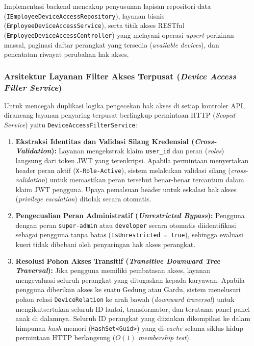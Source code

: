 Implementasi backend mencakup penyusunan lapisan repositori data (\texttt{IEmployeeDeviceAccessRepository}), layanan bisnis (\texttt{EmployeeDeviceAccessService}), serta titik akses RESTful (\texttt{EmployeeDeviceAccessController}) yang melayani operasi \textit{upsert} perizinan massal, paginasi daftar perangkat yang tersedia (\textit{available devices}), dan pencatatan riwayat perubahan hak akses.

\subsubsection{Arsitektur Layanan Filter Akses Terpusat (\textit{Device Access Filter Service})}

Untuk mencegah duplikasi logika pengecekan hak akses di setiap kontroler API, dirancang layanan penyaring terpusat berlingkup permintaan HTTP (\textit{Scoped Service}) yaitu \texttt{DeviceAccessFilterService}:

\begin{enumerate}[label=\arabic*., leftmargin=*, itemsep=0pt]
  \item \textbf{Ekstraksi Identitas dan Validasi Silang Kredensial (\textit{Cross-Validation}):} Layanan mengekstrak klaim \texttt{user\_id} dan peran (\textit{roles}) langsung dari token JWT yang terenkripsi. Apabila permintaan menyertakan header peran aktif (\texttt{X-Role-Active}), sistem melakukan validasi silang (\textit{cross-validation}) untuk memastikan peran tersebut benar-benar tercantum dalam klaim JWT pengguna. Upaya pemalsuan header untuk eskalasi hak akses (\textit{privilege escalation}) ditolak secara otomatis.
  \item \textbf{Pengecualian Peran Administratif (\textit{Unrestricted Bypass}):} Pengguna dengan peran \texttt{super-admin} atau \texttt{developer} secara otomatis diidentifikasi sebagai pengguna tanpa batas (\texttt{IsUnrestricted = true}), sehingga evaluasi kueri tidak dibebani oleh penyaringan hak akses perangkat.
  \item \textbf{Resolusi Pohon Akses Transitif (\textit{Transitive Downward Tree Traversal}):} Jika pengguna memiliki pembatasan akses, layanan mengevaluasi seluruh perangkat yang ditugaskan kepada karyawan. Apabila pengguna diberikan akses ke suatu Gedung atau Gardu, sistem menelusuri pohon relasi \texttt{DeviceRelation} ke arah bawah (\textit{downward traversal}) untuk mengikutsertakan seluruh ID lantai, transformator, dan terutama panel-panel anak di dalamnya. Seluruh ID perangkat yang diizinkan dikompilasi ke dalam himpunan \textit{hash} memori (\texttt{HashSet<Guid>}) yang di-\textit{cache} selama siklus hidup permintaan HTTP berlangsung ($O(1)$ \textit{membership test}).
\end{enumerate}

